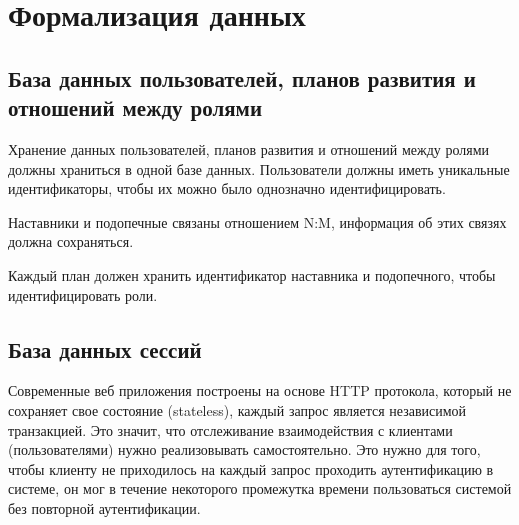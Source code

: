 %
%

%

\section{Формализация данных}

\subsection{База данных пользователей, планов развития и отношений между ролями}

Хранение данных пользователей, планов развития и отношений между ролями должны храниться в одной базе данных.
Пользователи должны иметь уникальные идентификаторы, чтобы их можно было однозначно идентифицировать.

Наставники и подопечные связаны отношением N:M, информация об этих связях должна сохраняться.

Каждый план должен хранить идентификатор наставника и подопечного, чтобы идентифицировать роли.

\subsection{База данных сессий}
Современные веб приложения построены на основе HTTP протокола, который не сохраняет свое состояние (stateless\cite{stateful-stateless}), каждый запрос
является независимой транзакцией.
Это значит, что отслеживание взаимодействия с клиентами (пользователями) нужно реализовывать самостоятельно.
Это нужно для того, чтобы клиенту не приходилось на каждый запрос проходить аутентификацию в системе, он мог в течение некоторого промежутка
времени пользоваться системой без повторной аутентификации.

